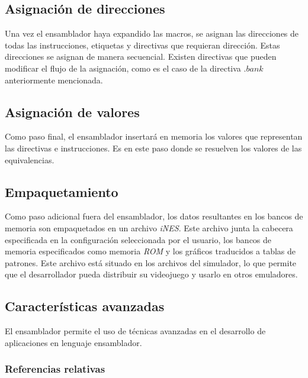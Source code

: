 \subsection{Asignación de direcciones}\label{subsec:asignacion-de-direcciones}

Una vez el ensamblador haya expandido las macros,
se asignan las direcciones de todas las instrucciones,
etiquetas y directivas que requieran dirección.
Estas direcciones se asignan de manera secuencial.
Existen directivas que pueden modificar el flujo de la asignación,
como es el caso de la directiva $.bank$ anteriormente mencionada.

\subsection{Asignación de valores}\label{subsec:asignacion-de-valores}

Como paso final, el ensamblador insertará en memoria los valores
que representan las directivas e instrucciones.
Es en este paso donde se resuelven los valores de las equivalencias.

\subsection{Empaquetamiento}\label{subsec:empaquetamiento}

Como paso adicional fuera del ensamblador, los datos resultantes
en los bancos de memoria son empaquetados en un archivo \textit{iNES}.
Este archivo junta la cabecera especificada en la configuración seleccionada
por el usuario, los bancos de memoria especificados como memoria
\textit{ROM} y los gráficos traducidos a tablas de patrones.
Este archivo está situado en los archivos del simulador, lo que
permite que el desarrollador pueda distribuir su videojuego
y usarlo en otros emuladores.

\subsection{Características avanzadas}\label{subsec:características-avanzadas}

El ensamblador permite el uso de técnicas avanzadas en
el desarrollo de aplicaciones en lenguaje ensamblador.

\subsubsection{Referencias relativas}\label{subsubsec:referencias-relativas}


